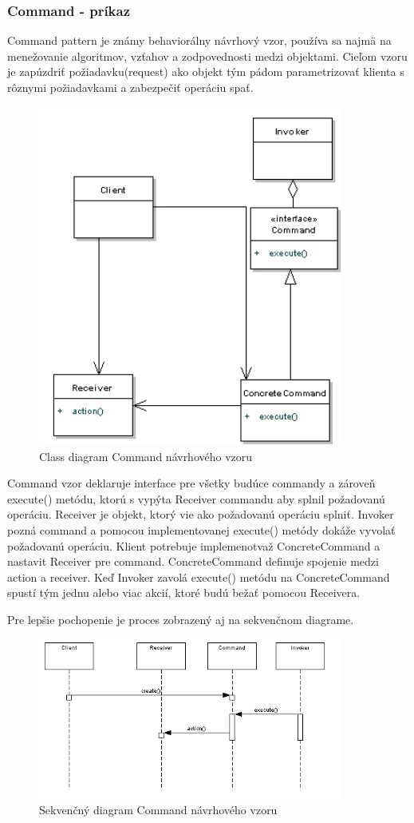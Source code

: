 \subsubsection{Command - príkaz}
\indent Command pattern je známy behaviorálny návrhový vzor, používa sa najmä na menežovanie algoritmov, vzťahov a zodpovednosti medzi objektami. 
Cieľom vzoru je zapúzdriť požiadavku(request) ako objekt tým pádom parametrizovať klienta s rôznymi požiadavkami a zabezpečiť operáciu spať.
\begin{figure}[!htbp]
	\centering
	\includegraphics[width=10cm]{img/command_pattern_class.jpg}
	\caption{Class diagram Command návrhového vzoru}
	\label{fig:test}
\end{figure}
\newline
Command vzor deklaruje interface pre všetky budúce commandy a zároveň execute() metódu, ktorú s vypýta Receiver commandu aby splnil požadovanú operáciu.
Receiver je objekt, ktorý vie ako požadovanú operáciu splniť. Invoker pozná command a pomocou implementovanej execute() metódy dokáže vyvolať požadovanú operáciu.
Klient potrebuje implemenotvaž ConcreteCommand a nastavit Receiver pre command. ConcreteCommand definuje spojenie medzi action a receiver. Keď Invoker zavolá execute() metódu na ConcreteCommand spustí tým jednu alebo viac akcií, ktoré budú bežať pomocou Receivera.

Pre lepšie pochopenie je proces zobrazený aj na sekvenčnom diagrame.
\begin{figure}[!htbp]
	\centering
	\includegraphics[width=10cm]{img/command_seq.jpg}
	\caption{Sekvenčný diagram Command návrhového vzoru}
	\label{fig:test}
\end{figure}
\newline

